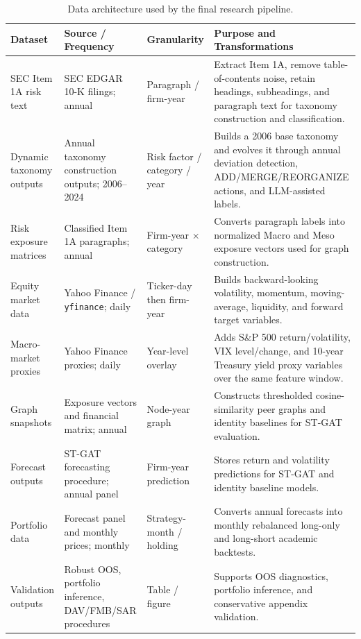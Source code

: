 \documentclass[11pt, a4paper]{article}
\begin{document}
\begin{table}[H]
\centering
\caption{Data architecture used by the final research pipeline.}
\label{tab:data_architecture}
\vspace{0.2cm}
\renewcommand{\arraystretch}{1.16}
\small
\begin{tabularx}{\textwidth}{@{}L{2.9cm}L{2.5cm}L{2.2cm}Y@{}}
\toprule
\textbf{Dataset} & \textbf{Source / Frequency} & \textbf{Granularity} & \textbf{Purpose and Transformations} \\
\midrule
SEC Item 1A risk text & SEC EDGAR 10-K filings; annual & Paragraph / firm-year & Extract Item 1A, remove table-of-contents noise, retain headings, subheadings, and paragraph text for taxonomy construction and classification. \\
Dynamic taxonomy outputs & Annual taxonomy construction outputs; 2006--2024 & Risk factor / category / year & Builds a 2006 base taxonomy and evolves it through annual deviation detection, ADD/MERGE/REORGANIZE actions, and LLM-assisted labels. \\
Risk exposure matrices & Classified Item 1A paragraphs; annual & Firm-year $\times$ category & Converts paragraph labels into normalized Macro and Meso exposure vectors used for graph construction. \\
Equity market data & Yahoo Finance / \texttt{yfinance}; daily & Ticker-day then firm-year & Builds backward-looking volatility, momentum, moving-average, liquidity, and forward target variables. \\
Macro-market proxies & Yahoo Finance proxies; daily & Year-level overlay & Adds S\&P 500 return/volatility, VIX level/change, and 10-year Treasury yield proxy variables over the same feature window. \\
Graph snapshots & Exposure vectors and financial matrix; annual & Node-year graph & Constructs thresholded cosine-similarity peer graphs and identity baselines for ST-GAT evaluation. \\
Forecast outputs & ST-GAT forecasting procedure; annual panel & Firm-year prediction & Stores return and volatility predictions for ST-GAT and identity baseline models. \\
Portfolio data & Forecast panel and monthly prices; monthly & Strategy-month / holding & Converts annual forecasts into monthly rebalanced long-only and long-short academic backtests. \\
Validation outputs & Robust OOS, portfolio inference, DAV/FMB/SAR procedures & Table / figure & Supports OOS diagnostics, portfolio inference, and conservative appendix validation. \\
\bottomrule
\end{tabularx}
\end{table}
\end{document}
